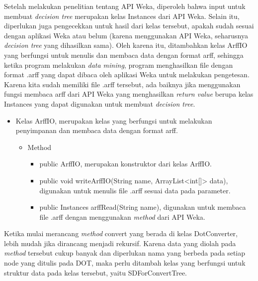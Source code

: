 	Setelah melakukan penelitian tentang API Weka, diperoleh bahwa input untuk membuat \textsl{decision tree} merupakan kelas Instances dari API Weka. Selain itu, diperlukan juga pengecekkan untuk hasil dari kelas tersebut, apakah sudah sesuai dengan aplikasi Weka atau belum (karena menggunakan API Weka, seharusnya \textsl{decision tree} yang dihasilkan sama). Oleh karena itu, ditambahkan kelas ArffIO yang berfungsi untuk menulis dan membaca data dengan format arff, sehingga ketika program melakukan \textsl{data mining}, program menghasilkan file dengan format .arff yang dapat dibaca oleh aplikasi Weka untuk melakukan pengetesan. Karena kita sudah memiliki file .arff tersebut, ada baiknya jika menggunakan fungsi membaca arff dari API Weka yang menghasilkan \textsl{return value} berupa kelas Instances yang dapat digunakan untuk membuat \textsl{decision tree}.

\begin{itemize}
	\item Kelas ArffIO, merupakan kelas yang berfungsi untuk melakukan penyimpanan dan membaca data dengan format arff.
	\begin{itemize}
		\item Method
		\begin{itemize}
			\item public ArffIO, merupakan konstruktor dari kelas ArffIO.
			\item public void writeArffIO(String name, ArrayList<int[]> data), digunakan untuk menulis file .arff sesuai data pada parameter.
			\item public Instances arffRead(String name), digunakan untuk membaca file .arff dengan menggunakan \textsl{method} dari API Weka.
		\end{itemize}
	\end{itemize}
\end{itemize}

Ketika mulai merancang \textsl{method} convert yang berada di kelas DotConverter, lebih mudah jika dirancang menjadi rekursif. Karena data yang diolah pada \textsl{method}
tersebut cukup banyak dan diperlukan nama yang berbeda pada setiap node yang ditulis pada DOT, maka perlu ditambah kelas yang berfungsi untuk struktur data pada kelas tersebut, yaitu SDForConvertTree.

